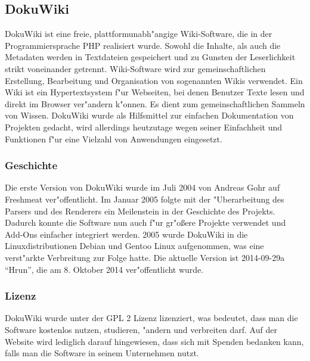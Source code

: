 \subsection*{DokuWiki}
DokuWiki ist eine freie, plattformunabh"angige Wiki-Software, die in der Programmiersprache PHP realisiert wurde. Sowohl die Inhalte, als auch die Metadaten werden in Textdateien gespeichert und zu Gunsten der Leserlichkeit strikt voneinander getrennt. Wiki-Software wird zur gemeinschaftlichen Erstellung, Bearbeitung und Organisation von sogenannten Wikis verwendet. Ein Wiki ist ein Hypertextsystem f"ur Webseiten, bei denen Benutzer Texte lesen und direkt im Browser ver"andern k"onnen. Es dient zum gemeinschaftlichen Sammeln von Wissen. DokuWiki wurde als Hilfsmittel zur einfachen Dokumentation von Projekten gedacht, wird allerdings heutzutage wegen seiner Einfachheit und Funktionen f"ur eine Vielzahl von Anwendungen eingesetzt.
\subsubsection*{Geschichte}
Die erste Version von DokuWiki wurde im Juli 2004 von Andreas Gohr auf Freshmeat ver"offentlicht. Im Januar 2005 folgte mit der "Uberarbeitung des Parsers und des Renderers ein Meilenstein in der Geschichte des Projekts. Dadurch konnte die Software nun auch f"ur gr"oßere Projekte verwendet und Add-Ons einfacher integriert werden. 2005 wurde DokuWiki in die Linuxdistributionen Debian und Gentoo Linux aufgenommen, was eine verst"arkte Verbreitung zur Folge hatte. Die aktuelle Version ist 2014-09-29a "`Hrun"', die am 8. Oktober 2014 ver"offentlicht wurde.
\subsubsection*{Lizenz}
DokuWiki wurde unter der GPL 2 Lizenz lizenziert, was bedeutet, dass man die Software kostenlos nutzen, studieren, "andern und verbreiten darf. Auf der Website wird lediglich darauf hingewiesen, dass sich mit Spenden bedanken kann, falls man die Software in seinem Unternehmen nutzt.
